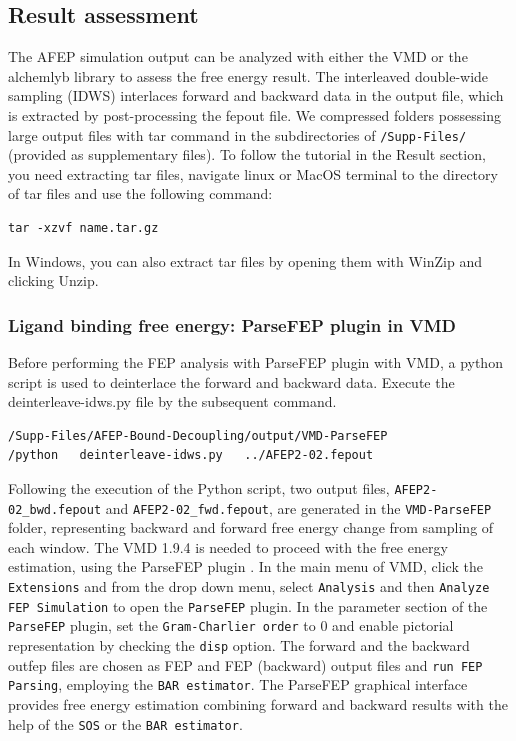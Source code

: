 \documentclass[9pt,tutorial]{livecoms}
\begin{document}
\subsection{Result assessment}
The AFEP simulation output can be analyzed with either the VMD or the alchemlyb library to assess the free energy result. The interleaved double-wide sampling (IDWS) interlaces forward and backward data in the output file, which is extracted by post-processing the fepout file. We compressed folders possessing large output files with tar command in the subdirectories of \texttt{/Supp-Files/} (provided as supplementary files). To follow the tutorial in the Result section, you need extracting tar files, navigate linux or MacOS terminal to the directory of tar files and use the following command:
\begin{verbatim}
tar -xzvf name.tar.gz
\end{verbatim}
In Windows, you can also extract tar files by opening them with WinZip and clicking Unzip.
\subsubsection{Ligand binding free energy: ParseFEP plugin in VMD}
Before performing the FEP analysis with ParseFEP plugin with VMD, a python script is used to deinterlace the forward and backward data. Execute the deinterleave-idws.py file by the subsequent command.
\begin{verbatim}
/Supp-Files/AFEP-Bound-Decoupling/output/VMD-ParseFEP
/python   deinterleave-idws.py   ../AFEP2-02.fepout
\end{verbatim}
Following the execution of the Python script, two output files, \texttt{AFEP2-02\_bwd.fepout} and \texttt{AFEP2-02\_fwd.fepout}, are generated in the \texttt{VMD-ParseFEP} folder, representing backward and forward free energy change from sampling of each window. The VMD 1.9.4 is needed to proceed with the free energy estimation, using the ParseFEP plugin \cite{Liu2012}.
In the main menu of VMD, click the \texttt{Extensions} and from the drop down menu, select \texttt{Analysis} and then \texttt{Analyze FEP Simulation} to open the \texttt{ParseFEP} plugin. In the parameter section of the \texttt{ParseFEP} plugin, set the \texttt{Gram-Charlier order} to 0 and enable pictorial representation by checking the \texttt{disp} option. The forward and the backward outfep files are chosen as FEP and FEP (backward) output files and \texttt{run FEP Parsing}, employing the \texttt{BAR estimator}. The ParseFEP graphical interface provides free energy estimation combining forward and backward results with the help of the \texttt{SOS} or the \texttt{BAR estimator}. 
\end{document}
